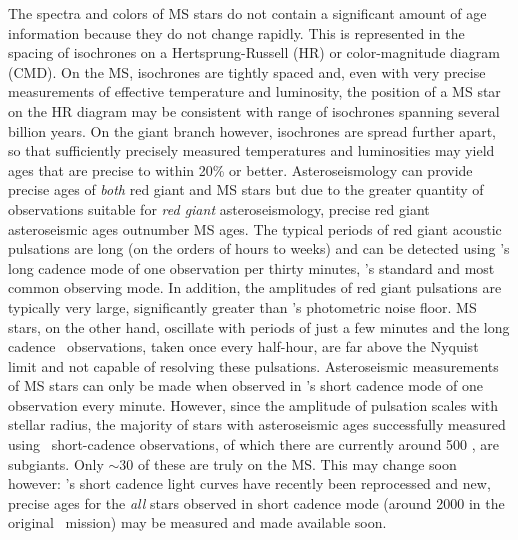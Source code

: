 The spectra and colors of MS stars do not contain a significant amount of age
information because they do not change rapidly.
This is represented in the spacing of isochrones on a Hertsprung-Russell (HR)
or color-magnitude diagram (CMD).
On the MS, isochrones are tightly spaced and, even with very precise
measurements of effective temperature and luminosity, the position of a MS
star on the HR diagram may be consistent with range of isochrones spanning
several billion years.
On the giant branch however, isochrones are spread further apart, so that
sufficiently precisely measured temperatures and luminosities may yield ages
that are precise to within 20\% or better.
 Asteroseismology
can provide precise ages of {\it both} red giant and MS stars but due to the
greater quantity of observations suitable for {\it red giant}
asteroseismology, precise red giant asteroseismic ages outnumber MS ages.
The typical periods of red giant acoustic pulsations are long (on the orders
of hours to weeks) and can be detected using \kepler's long cadence mode of
one observation per thirty minutes, \kepler's standard and most common
observing mode.
In addition, the amplitudes of red giant pulsations are typically very large,
significantly greater than \kepler's photometric noise floor.
MS stars, on the other hand, oscillate with periods of just a few minutes and
the long cadence \kepler\ observations, taken once every half-hour, are
far above the Nyquist limit and not capable of resolving these pulsations.
Asteroseismic measurements of MS stars can only be made when observed in
\kepler's short cadence mode of one observation every minute.
However, since the amplitude of pulsation scales with stellar radius, the
majority of stars with asteroseismic ages successfully measured using \kepler\
short-cadence observations, of which there are currently around 500
\citep{chaplin2014}, are subgiants.
Only $\sim$30 of these are truly on the MS.
This may change soon however: \kepler's short cadence
light curves have recently been reprocessed and new, precise ages for the {\it
all} stars observed in short cadence mode (around 2000 in the original
\kepler\ mission) may be measured and made available soon.

